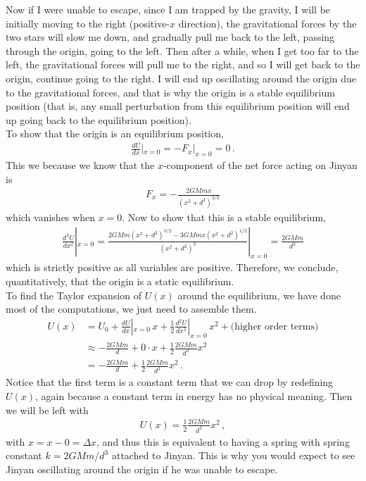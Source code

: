 \documentclass[11pt]{article}
\begin{document}
Now if I were unable to escape, since I am trapped by the gravity, I will be initially moving to the right (positive-$x$ direction), the gravitational forces by the two stars will slow me down, and gradually pull me back to the left, passing through the origin, going to the left. Then after a while, when I get too far to the left, the gravitational forces will pull me to the right, and so I will get back to the origin, continue going to the right. I will end up oscillating around the origin due to the gravitational forces, and that is why the origin is a stable equilibrium position (that is, any small perturbation from this equilibrium position will end up going back to the equilibrium position).\\

To show that the origin is an equilibrium position, 
\begin{align*}
\frac{dU}{dx}|_{x = 0} = -F_x|_{x=0} = 0\,.
\end{align*}
This we because we know that the $x$-component of the net force acting on Jinyan is
\begin{align*}
F_x = -\frac{2GMmx}{(x^2 + d^2)^{3/2}}
\end{align*}
which vanishes when $x = 0$. Now to show that this is a stable equilibrium, 
\begin{align*}
\frac{d^2 U}{dx^2}|_{x=0} = \frac{2GMm(x^2+d^2)^{3/2} - 3GMmx(x^2+d^2)^{1/2}}{(x^2+d^2)^3}|_{x = 0} = \frac{2GMm}{d^3}
\end{align*}
which is strictly positive as all variables are positive. Therefore, we conclude, quantitatively, that the origin is a static equilibrium. \\

To find the Taylor expansion of $U(x)$ around the equilibrium, we have done most of the computations, we just need to assemble them. 
\begin{align*}
U(x) &= U_0 + \frac{dU}{dx}|_{x=0}\, x + \frac{1}{2}\frac{d^2U}{dx^2}|_{x=0}\, x^2 + \text{(higher order terms)}\\
&\approx -\frac{2GMm}{d} + 0\cdot x + \frac{1}{2}\frac{2GMm}{d^3}x^2\\
&=-\frac{2GMm}{d}  + \frac{1}{2}\frac{2GMm}{d^3}x^2\,.
\end{align*}
Notice that the first term is a constant term that we can drop by redefining $U(x)$, again because a constant term in energy has no physical meaning. Then we will be left with
\begin{align*}
U(x) = \frac{1}{2}\frac{2GMm}{d^3} x^2\,,
\end{align*}
with $x = x-0 = \Delta x$, and thus this is equivalent to having a spring with spring constant $k = 2GMm/d^3$ attached to Jinyan. This is why you would expect to see Jinyan oscillating around the origin if he was unable to escape.
\end{document}
